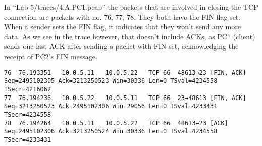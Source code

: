 In ``Lab 5/traces/4.A.PC1.pcap'' the packets that are involved in closing the TCP connection are packets with no. 76, 77, 78. They both have the FIN flag set. When a sender sets the FIN flag, it indicates that they won't send any more data. As we see in the trace however, that doesn't include ACKs, as PC1 (client) sends one last ACK after sending a packet with FIN set, acknowledging the receipt of PC2's FIN message.

\begin{lstlisting}
76	76.193351	10.0.5.11	10.0.5.22	TCP	66	48613→23 [FIN, ACK] Seq=2495102305 Ack=3213250523 Win=30336 Len=0 TSval=4234558 TSecr=4216062
77	76.194236	10.0.5.22	10.0.5.11	TCP	66	23→48613 [FIN, ACK] Seq=3213250523 Ack=2495102306 Win=29056 Len=0 TSval=4233431 TSecr=4234558
78	76.194264	10.0.5.11	10.0.5.22	TCP	66	48613→23 [ACK] Seq=2495102306 Ack=3213250524 Win=30336 Len=0 TSval=4234558 TSecr=4233431
\end{lstlisting}